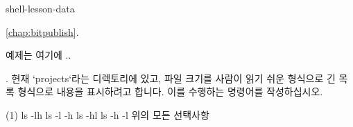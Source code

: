 
\index{}
\textbf{}

shell-lesson-data

\label{chap:bitpublish}
\setcounter{exam_num_bitpub}{0}

\addtocounter{exam_num_bitpub}{1}
\begin{example}{\ref{chap:bitpublish}.}

예제는 여기에 ..

\end{example}


\begin{Exercise}\label{Ex2}

.  현재 `projects`라는 디렉토리에 있고, 파일 크기를 사람이 읽기 쉬운 형식으로 긴 목록 형식으로 내용을 표시하려고 합니다. 이를 수행하는 명령어를 작성하십시오.
\begin{tasks}[label=(\arabic*)](1)
\task  ls -lh
\task  ls -l -h
\task  ls -hl
\task  ls -h -l
\task  위의 모든 선택사항
\end{tasks}

\end{Exercise}





